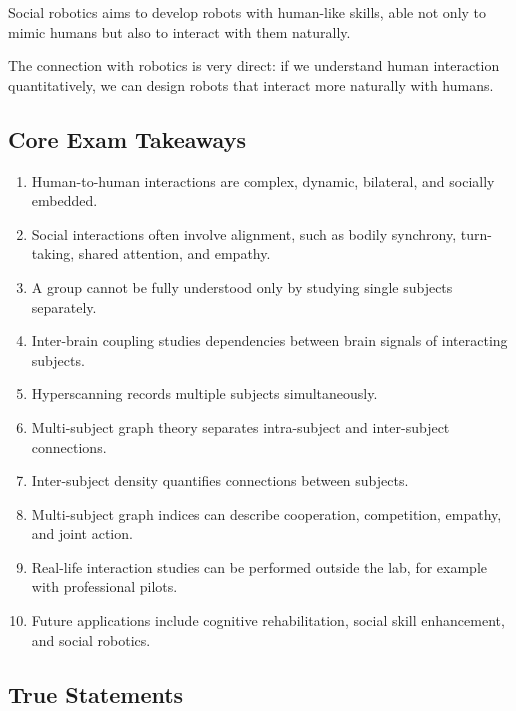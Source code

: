 Social robotics aims to develop robots with human-like skills, able not only to mimic humans but also to interact with them naturally.

\begin{authornote}
The connection with robotics is very direct: if we understand human interaction quantitatively, we can design robots that interact more naturally with humans.
\end{authornote}

\subsection{Core Exam Takeaways}

\begin{enumerate}
    \item Human-to-human interactions are complex, dynamic, bilateral, and socially embedded.
    \item Social interactions often involve alignment, such as bodily synchrony, turn-taking, shared attention, and empathy.
    \item A group cannot be fully understood only by studying single subjects separately.
    \item Inter-brain coupling studies dependencies between brain signals of interacting subjects.
    \item Hyperscanning records multiple subjects simultaneously.
    \item Multi-subject graph theory separates intra-subject and inter-subject connections.
    \item Inter-subject density quantifies connections between subjects.
    \item Multi-subject graph indices can describe cooperation, competition, empathy, and joint action.
    \item Real-life interaction studies can be performed outside the lab, for example with professional pilots.
    \item Future applications include cognitive rehabilitation, social skill enhancement, and social robotics.
\end{enumerate}

\subsection{True Statements}

